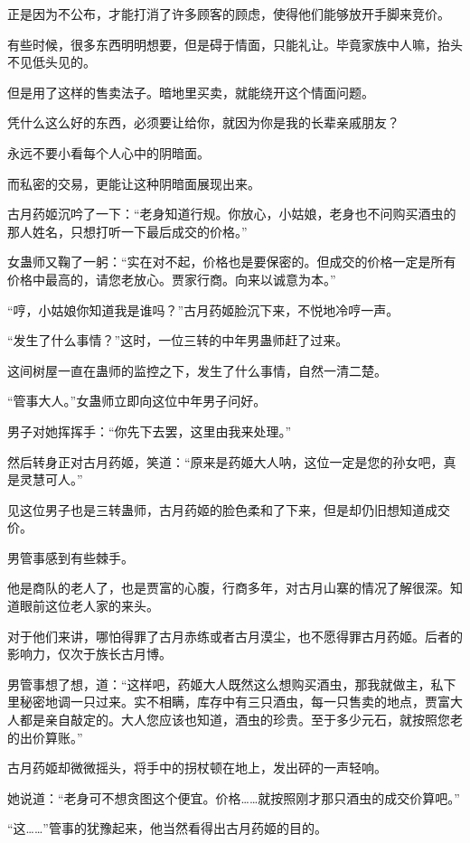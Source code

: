 \begin{this_body}
正是因为不公布，才能打消了许多顾客的顾虑，使得他们能够放开手脚来竞价。

有些时候，很多东西明明想要，但是碍于情面，只能礼让。毕竟家族中人嘛，抬头不见低头见的。

但是用了这样的售卖法子。暗地里买卖，就能绕开这个情面问题。

凭什么这么好的东西，必须要让给你，就因为你是我的长辈亲戚朋友？

永远不要小看每个人心中的阴暗面。

而私密的交易，更能让这种阴暗面展现出来。

古月药姬沉吟了一下：“老身知道行规。你放心，小姑娘，老身也不问购买酒虫的那人姓名，只想打听一下最后成交的价格。”

女蛊师又鞠了一躬：“实在对不起，价格也是要保密的。但成交的价格一定是所有价格中最高的，请您老放心。贾家行商。向来以诚意为本。”

“哼，小姑娘你知道我是谁吗？”古月药姬脸沉下来，不悦地冷哼一声。

“发生了什么事情？”这时，一位三转的中年男蛊师赶了过来。

这间树屋一直在蛊师的监控之下，发生了什么事情，自然一清二楚。

“管事大人。”女蛊师立即向这位中年男子问好。

男子对她挥挥手：“你先下去罢，这里由我来处理。”

然后转身正对古月药姬，笑道：“原来是药姬大人呐，这位一定是您的孙女吧，真是灵慧可人。”

见这位男子也是三转蛊师，古月药姬的脸色柔和了下来，但是却仍旧想知道成交价。

男管事感到有些棘手。

他是商队的老人了，也是贾富的心腹，行商多年，对古月山寨的情况了解很深。知道眼前这位老人家的来头。

对于他们来讲，哪怕得罪了古月赤练或者古月漠尘，也不愿得罪古月药姬。后者的影响力，仅次于族长古月博。

男管事想了想，道：“这样吧，药姬大人既然这么想购买酒虫，那我就做主，私下里秘密地调一只过来。实不相瞒，库存中有三只酒虫，每一只售卖的地点，贾富大人都是亲自敲定的。大人您应该也知道，酒虫的珍贵。至于多少元石，就按照您老的出价算账。”

古月药姬却微微摇头，将手中的拐杖顿在地上，发出砰的一声轻响。

她说道：“老身可不想贪图这个便宜。价格……就按照刚才那只酒虫的成交价算吧。”

“这……”管事的犹豫起来，他当然看得出古月药姬的目的。


\end{this_body}
